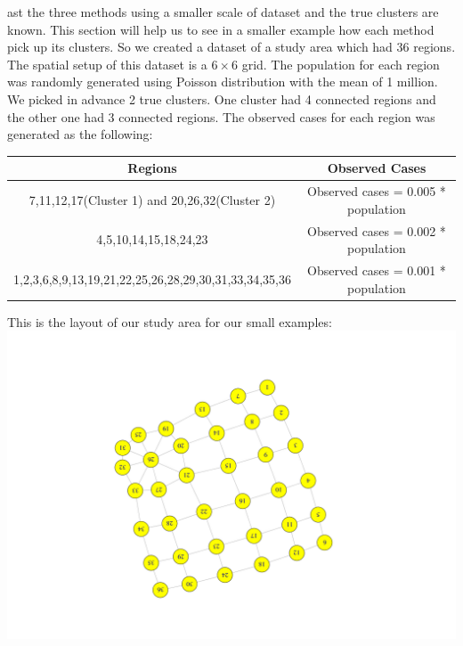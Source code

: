 \documentclass[12pt]{article}
\begin{document}
\begin{enumerate}
ast the three methods using a smaller scale of dataset and the true clusters are known. This section will help us to see in a smaller example how each method pick up its clusters. So we created a dataset of a study area which had 36 regions. The spatial setup of this dataset is a $6\times6$ grid. The population for each region was randomly generated using Poisson distribution with the mean of 1 million. We picked in advance 2 true clusters. One cluster had 4 connected regions and the other one had 3 connected regions. The observed cases for each region was generated as the following: \\
		
	\begin{tabular}{|c|c|}
	\hline
	Regions & Observed Cases \\
	\hline
	7,11,12,17(Cluster 1) and 20,26,32(Cluster 2) & Observed cases = 0.005 * population \\ 
	4,5,10,14,15,18,24,23 & Observed cases = 0.002 * population \\
	1,2,3,6,8,9,13,19,21,22,25,26,28,29,30,31,33,34,35,36 & Observed cases = 0.001 * population \\
	\hline
	\end{tabular}	
	
	\end{enumerate} 
	This is the layout of our study area for our small examples:\\
		\includegraphics[scale=0.3]{Area_layout} \\
	
\end{document}
